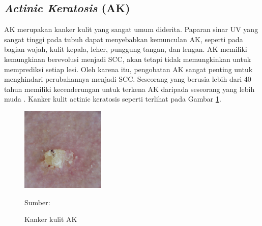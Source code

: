     \subsection{\textit{Actinic Keratosis} (AK)}
    AK merupakan kanker kulit yang sangat umum diderita. Paparan sinar UV yang sangat tinggi pada tubuh dapat menyebabkan kemunculan AK, seperti pada bagian wajah, kulit kepala, leher, punggung tangan, dan lengan. AK memiliki kemungkinan berevolusi menjadi SCC, akan tetapi tidak memungkinkan untuk memprediksi setiap lesi. Oleh karena itu, pengobatan AK sangat penting untuk menghindari perubahannya menjadi SCC. Seseorang yang berusia lebih dari 40 tahun memiliki kecenderungan untuk terkena AK daripada seseorang yang lebih muda \citep{Dianzani2020}. Kanker kulit actinic keratosis seperti terlihat pada Gambar \ref{fig:ak}.
    \begin{figure}[H] 
        \begin{center} 
            \includegraphics[width=4cm]{../img/Skin Cancer AK - Latex.jpg}
            \caption{Kanker kulit AK} 
            \label{fig:ak}
            Sumber: \citep{Codella2018,Combalia2019,Tschandl2018}
        \end{center} 
    \end{figure}

